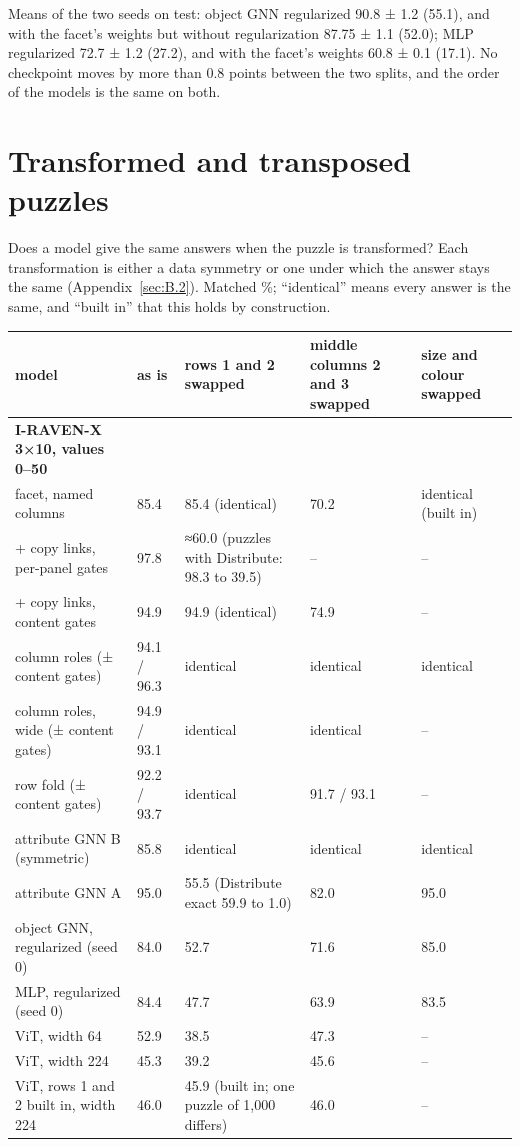 Means of the two seeds on test: object GNN regularized 90.8 ± 1.2 (55.1), and with the facet's weights but without regularization 87.75 ± 1.1 (52.0); MLP regularized 72.7 ± 1.2 (27.2), and with the facet's weights 60.8 ± 0.1 (17.1). No checkpoint moves by more than 0.8 points between the two splits, and the order of the models is the same on both.

\section{Transformed and transposed puzzles}\label{sec:D.3}

Does a model give the same answers when the puzzle is transformed? Each transformation is either a data symmetry or one under which the answer stays the same (Appendix~\ref{sec:B.2}). Matched \%; ``identical'' means every answer is the same, and ``built in'' that this holds by construction.

\begin{center}\small
\begin{tabularx}{\linewidth}{@{}YlYYY@{}}
\toprule
model & as is & rows 1 and 2 swapped & middle columns 2 and 3 swapped & size and colour swapped \\
\midrule
\textbf{I-RAVEN-X 3×10, values 0–50} &  &  &  &  \\
facet, named columns & 85.4 & 85.4 (identical) & 70.2 & identical (built in) \\
+ copy links, per-panel gates & 97.8 & ≈60.0 (puzzles with Distribute: 98.3 to 39.5) & – & – \\
+ copy links, content gates & 94.9 & 94.9 (identical) & 74.9 & – \\
column roles (± content gates) & 94.1 / 96.3 & identical & identical & identical \\
column roles, wide (± content gates) & 94.9 / 93.1 & identical & identical & – \\
row fold (± content gates) & 92.2 / 93.7 & identical & 91.7 / 93.1 & – \\
attribute GNN B (symmetric) & 85.8 & identical & identical & identical \\
attribute GNN A & 95.0 & 55.5 (Distribute exact 59.9 to 1.0) & 82.0 & 95.0 \\
object GNN, regularized (seed 0) & 84.0 & 52.7 & 71.6 & 85.0 \\
MLP, regularized (seed 0) & 84.4 & 47.7 & 63.9 & 83.5 \\
ViT, width 64 & 52.9 & 38.5 & 47.3 & – \\
ViT, width 224 & 45.3 & 39.2 & 45.6 & – \\
ViT, rows 1 and 2 built in, width 224 & 46.0 & 45.9 (built in; one puzzle of 1,000 differs) & 46.0 & – \\
\bottomrule
\end{tabularx}
\end{center}

